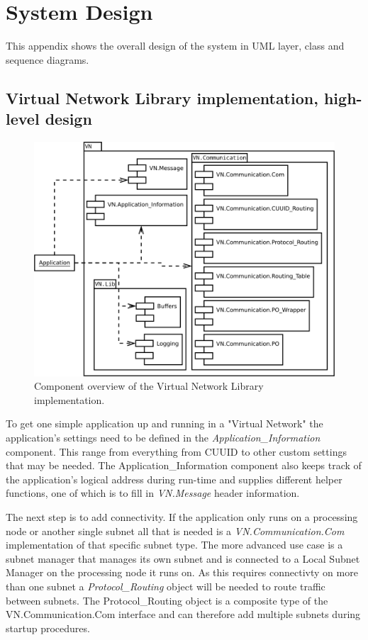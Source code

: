 \chapter{System Design}\label{ch:appendix_design}
This appendix shows the overall design of the system in UML layer, class and
sequence diagrams.

\section{Virtual Network Library implementation, high-level
design}\label{sec:layered_design}

\begin{figure}[h]
    \centering
    \includegraphics[width=\textwidth]{figures/appendix_component_overview}
    \caption{Component overview of the Virtual Network Library implementation.}
    \label{fig:appendix_component_overview}
\end{figure}

To get one simple application up and running in a "Virtual Network" the
application's settings need to be defined in the \emph{Application\_Information}
component. This range from everything from CUUID to other custom settings that
may be needed. The Application\_Information component also keeps track of the
application's logical address during run-time and supplies different helper
functions, one of which is to fill in \emph{VN.Message} header information.

The next step is to add connectivity. If the application only runs on a
processing node or another single subnet all that is needed is a
\emph{VN.Communication.Com} implementation of that specific subnet type. The
more advanced use case is a subnet manager that manages its own subnet and is
connected to a Local Subnet Manager on the processing node it runs on. As this
requires connectivty on more than one subnet a \emph{Protocol\_Routing} object
will be needed to route traffic between subnets. The Protocol\_Routing object
is a composite type of the VN.Communication.Com interface and can
therefore add multiple subnets during startup procedures.

